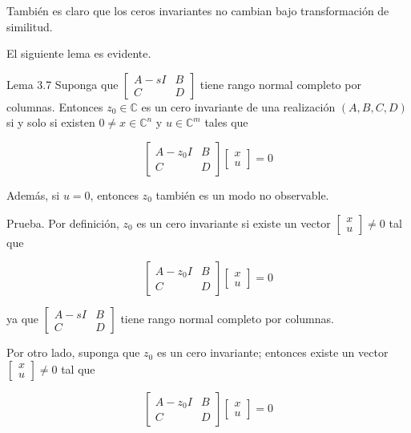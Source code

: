 \documentclass[11pt]{article}
\begin{document}
También es claro que los ceros invariantes no cambian bajo transformación de similitud.

El siguiente lema es evidente.

Lema 3.7 Suponga que $\left[\begin{array}{cc}A-s I & B \\ C & D\end{array}\right]$ tiene rango normal completo por columnas. Entonces $z_{0} \in \mathbb{C}$ es un cero invariante de una realización $(A, B, C, D)$ si y solo si existen $0 \neq x \in \mathbb{C}^{n}$ y $u \in \mathbb{C}^{m}$ tales que

$$
\left[\begin{array}{cc}
A-z_{0} I & B \\
C & D
\end{array}\right]\left[\begin{array}{l}
x \\
u
\end{array}\right]=0
$$

Además, si $u=0$, entonces $z_{0}$ también es un modo no observable.

Prueba. Por definición, $z_{0}$ es un cero invariante si existe un vector $\left[\begin{array}{l}x \\ u\end{array}\right] \neq 0$ tal que

$$
\left[\begin{array}{cc}
A-z_{0} I & B \\
C & D
\end{array}\right]\left[\begin{array}{l}
x \\
u
\end{array}\right]=0
$$

ya que $\left[\begin{array}{cc}A-s I & B \\ C & D\end{array}\right]$ tiene rango normal completo por columnas.

Por otro lado, suponga que $z_{0}$ es un cero invariante; entonces existe un vector $\left[\begin{array}{l}x \\ u\end{array}\right] \neq 0$ tal que

$$
\left[\begin{array}{cc}
A-z_{0} I & B \\
C & D
\end{array}\right]\left[\begin{array}{l}
x \\
u
\end{array}\right]=0
$$
\end{document}
